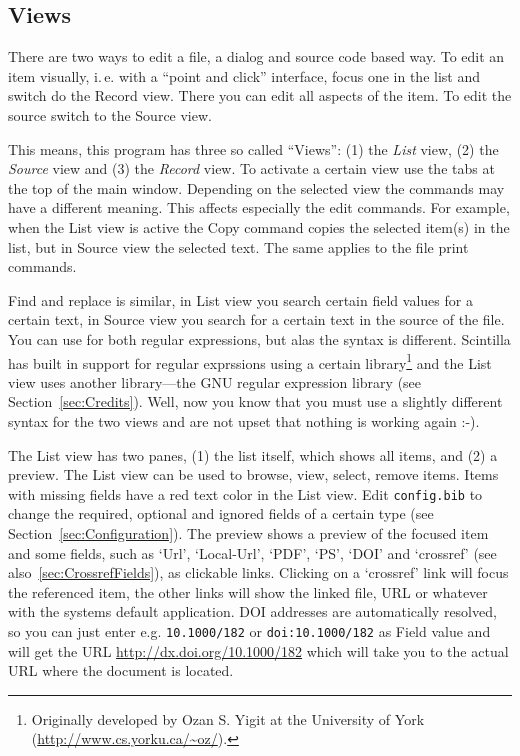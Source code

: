 \documentclass[oneside,10pt]{article}
\begin{document}
\subsection{Views}
\label{sec:Views}

There are two ways to edit a \BibTeX{} file, a dialog and source code based way. To
edit an item visually, i.\,e. with a ``point and click'' interface, focus one in
the list and switch do the Record view. There you can edit all aspects of the item.
To edit the source switch to the Source view.

This means, this program has three so called ``Views'': (1) the
\emph{List} view, (2) the \emph{Source} view
and (3) the \emph{Record} view. To activate a certain view use
the tabs at the top of the main window. Depending on the selected view the commands
may have a different meaning. This affects especially the edit commands. For example,
when the List view is active the Copy command copies the selected item(s) in the
list, but in Source view the selected text. The same applies to the file print
commands.

Find and replace is similar, in List view you search certain field values for a
certain text, in Source view you search for a certain text in the source of the
file. You can use for both regular expressions, but alas
the syntax is different. Scintilla has built in support for regular exprssions using
a certain library\footnote{Originally developed by Ozan S. Yigit at the University
of York (\url{http://www.cs.yorku.ca/~oz/}).} and the List view uses another library---the
GNU regular expression library (see Section~\ref{sec:Credits}). Well, now you
know that you must use a slightly different syntax for the two views and are not
upset that nothing is working again :-).

The List view has two panes, (1) the list itself, which shows all items, and (2)
a preview. The List view can be used to browse, view, select, remove items. Items
with missing fields have a red text color in the List view. Edit \verb|config.bib|
to change the required, optional and ignored fields of a certain type (see
Section~\ref{sec:Configuration}). The preview shows a preview of the focused item
and some fields, such as `Url', `Local-Url', `PDF',
`PS', `DOI' \cite{internationaldoifoundationidf:2005} and `crossref' (see
also~\ref{sec:CrossrefFields}), as clickable links. Clicking on a
`crossref' link will focus the referenced item, the other links will show the
linked file, URL or whatever with the systems default application. DOI
addresses are automatically resolved, so you can just enter e.g. \verb|10.1000/182|
or \verb|doi:10.1000/182| as Field value and will get the URL \url{http://dx.doi.org/10.1000/182}
which will take you to the actual URL where the document is located.
\end{document}
